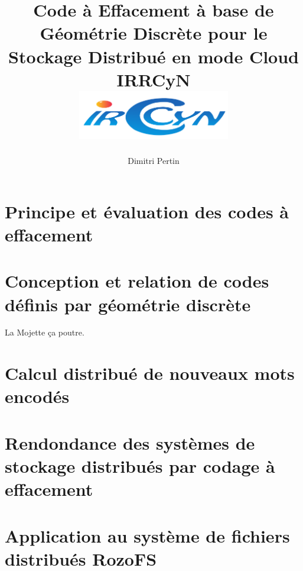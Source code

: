 
\makeindex



\title{
    {Code à Effacement à base de Géométrie Discrète pour le Stockage
    Distribué en mode Cloud}\\
    {\large IRRCyN}\\
    {\includegraphics[width=0.5\textwidth]{img/logo_irccyn.pdf}}
}
\author{Dimitri Pertin}
\date {}

\maketitle

\newpage

\tableofcontents

\chapter{Principe et évaluation des codes à effacement}

\chapter{Conception et relation de codes définis par géométrie discrète}

La Mojette ça poutre.

\chapter{Calcul distribué de nouveaux mots encodés}



\chapter{Rendondance des systèmes de stockage distribués par codage à
effacement}

\chapter{Application au système de fichiers distribués RozoFS}

\newpage

\printbibliography[
]

\printindex


